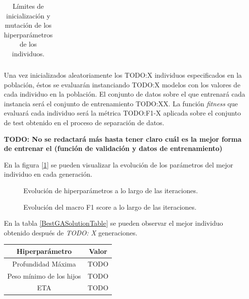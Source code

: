 \begin{enumerate}
\begin{table}[H]
\begin{tabular}{ |c|c|c| }
                    \end{tabular}

                \caption{Límites de inicialización y mutación de los hiperparámetros de los individuos.}
                \label{InitAndMutationLimitsHyperparamsTable}
            \end{table}

            Una vez inicializados aleatoriamente los TODO:X individuos especificados en la población, éstos se evaluarán instanciando TODO:X modelos con los valores de cada individuo en la población. El conjunto de datos sobre el que entrenará cada instancia  será el conjunto de entrenamiento TODO:XX. La función \textit{fitness} que evaluará cada individuo será la métrica TODO:F1-X aplicada sobre el conjunto de test obtenido en el proceso de separación de datos.

            \textbf{TODO: No se redactará más hasta tener claro cuál es la mejor forma de entrenar el  (función de validación y datos de entrenamiento)}

            En la figura [\ref{EvolucionHiperparametrosImage}] se pueden visualizar la evolución de los parámetros del mejor individuo en cada generación.

            \begin{figure}[H]
                \centering
                
                \caption{Evolución de hiperparámetros a lo largo de las iteraciones.}
                \label{EvolucionHiperparametrosImage}
             \end{figure}

            \begin{figure}[H]
                \centering
                
                \caption{Evolución del macro F1 score a lo largo de las iteraciones.}
                \label{EvolucionF1ScoreImage}
             \end{figure}
             
            En la tabla \ref{BestGASolutionTable} se pueden observar el mejor individuo obtenido después de \textit{TODO: X} generaciones.

            \begin{table}[H]
                \centering
                    \begin{tabular}{ |c|c| } 
                        \hline
                        Hiperparámetro & Valor\\
                        \hline
                            Profundidad Máxima & TODO \\ 
                            Peso mínimo de los hijos & TODO \\ 
                            ETA & TODO \\ 
                        \hline


\end{tabular}
\end{table}
\end{enumerate}
